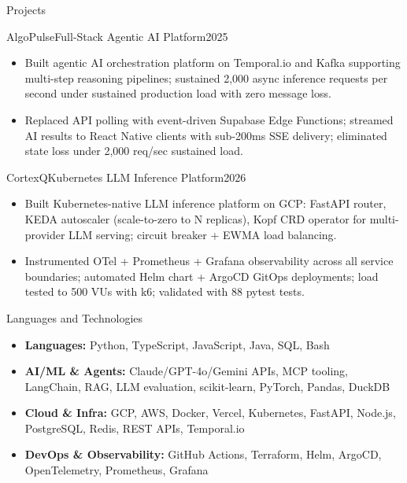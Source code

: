 \documentclass[]{mcdowellcv}
\begin{document}
\begin{cvsection}{Projects}
  \begin{cvsubsection}{AlgoPulse}{Full-Stack Agentic AI Platform}{2025}
    \begin{itemize}
      \item Built agentic AI orchestration platform on Temporal.io and Kafka supporting multi-step reasoning pipelines; sustained 2,000 async inference requests per second under sustained production load with zero message loss.
      \item Replaced API polling with event-driven Supabase Edge Functions; streamed AI results to React Native clients with sub-200ms SSE delivery; eliminated state loss under 2,000 req/sec sustained load.
    \end{itemize}
    \vspace{-1.5pt}
  \end{cvsubsection}

  \begin{cvsubsection}{CortexQ}{Kubernetes LLM Inference Platform}{2026}
    \begin{itemize}
      \item Built Kubernetes-native LLM inference platform on GCP: FastAPI router, KEDA autoscaler (scale-to-zero to N replicas), Kopf CRD operator for multi-provider LLM serving; circuit breaker + EWMA load balancing.
      \item Instrumented OTel + Prometheus + Grafana observability across all service boundaries; automated Helm chart + ArgoCD GitOps deployments; load tested to 500 VUs with k6; validated with 88 pytest tests.
    \end{itemize}
  \end{cvsubsection}
\end{cvsection}

\begin{cvsection}{Languages and Technologies}
  \begin{cvsubsection}{}{}{}
    \begin{itemize}
      \item \textbf{Languages:} Python, TypeScript, JavaScript, Java, SQL, Bash
      \item \textbf{AI/ML \& Agents:} Claude/GPT-4o/Gemini APIs, MCP tooling, LangChain, RAG, LLM evaluation, scikit-learn, PyTorch, Pandas, DuckDB
      \item \textbf{Cloud \& Infra:} GCP, AWS, Docker, Vercel, Kubernetes, FastAPI, Node.js, PostgreSQL, Redis, REST APIs, Temporal.io
      \item \textbf{DevOps \& Observability:} GitHub Actions, Terraform, Helm, ArgoCD, OpenTelemetry, Prometheus, Grafana
    \end{itemize}
  \end{cvsubsection}
\end{cvsection}
\end{document}
